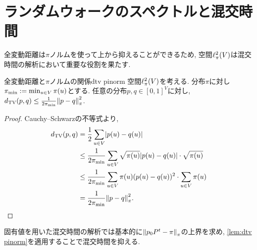 \begin{comment}
\paragraph*{遷移確率行列を左右どちらから作用させるか?}
\cref{eq:p_t}では遷移確率行列$P$を右から作用させることで次のステップのランダムウォークの分布が得られることがわかる.
では, 遷移確率行列$P$を左から作用させて得られる線形作用素はどのような意味合いを持つだろうか?
ベクトル$f\in \Real^V$を関数$f\colon V \to \Real$とみなす.
遷移確率行列$P$ を$f$に左から作用させて得られる関数 $Pf\colon V\to \Real$ は
\[
    (Pf)(u) = \sum_{v\in V}P(u,v)f(v) = \mathbb{E}_{v\sim P(u,\cdot)}[f(v)]
\]
と表せる. ここで, $\E_{v\sim P(u,\cdot)}[f(v)]$とは$P$の第$u$行が定める$V$上の分布に従ってランダムに選ばれた頂点$v$に対して$f(v)$の期待値を意味する.
従って, 線形作用素としての$P$は$V$上の関数$f$に対し局所的に$P(u,\cdot)$で重みつけして平均化しているとみなせる.

可逆なランダムウォークを考える限りにおいては\cref{prop:reversible adjoint}から本質的にはどちらを考えても変わらない.
ただし, 応用側の都合で混交時間の定義において全変動距離を用いており, 全変動距離は通常の$\ell^1$ノルムを用いているため, 本来考えるべきであろう自然な$\ell^1$ノルム$f \mapsto \sum_{u \in V} \pi(u)\abs{f(u)}$に対して$\pi_{\min} \defeq \min_{u\in V}\pi(u)$倍程度のギャップが生じる.
\end{comment}

\section{ランダムウォークのスペクトルと混交時間}

全変動距離は$\pi$ノルムを使って上から抑えることができるため, 空間$\ell^2_\pi(V)$は混交時間の解析において重要な役割を果たす.
%
\begin{lemma}{全変動距離と$\pi$ノルムの関係}{dtv pinorm}
    空間$\ell^2_\pi(V)$を考える.
    分布$\pi$に対し$\pi_{\min} \mathrel{:=} \min_{u \in V} \pi(u)$とする.
    任意の分布$p,q \in [0,1]^V$に対し, 
    $\dtv(p,q) \le \frac{1}{2\pimin} \pinorm{p-q}^2$.
\end{lemma}
\begin{proof}
    Cauchy--Schwarzの不等式より,
    \begin{align*}
        \dtv(p,q) &= \frac{1}{2} \sum_{u \in V} \abs*{p(u) - q(u)} \\
        &\le \frac{1}{2\pimin} \sum_{u\in V} \sqrt{\pi(u)}  \abs*{p(u) - q(u)} \cdot \sqrt{\pi(u)} \\
        & \le  \frac{1}{2\pimin} \sum_{u\in V} \pi(u)(p(u) - q(u))^2 \cdot \sum_{u\in V} \pi(u) \\
        &= \frac{1}{2\pimin} \pinorm{p-q}^2.
    \end{align*}
\end{proof}
%
固有値を用いた混交時間の解析では基本的に$\left\lVert p_0P^t-\pi\right\rVert_{\pi}$の上界を求め,
\cref{lem:dtv pinorm}を適用することで混交時間を抑える.

